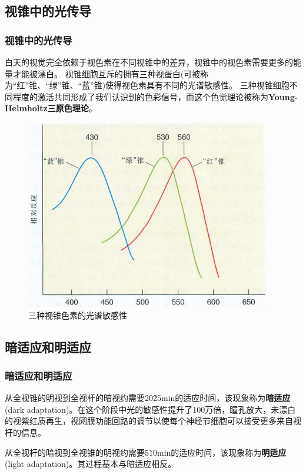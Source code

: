\subsection{视锥中的光传导}
\begin{frame}
    \frametitle{视锥中的光传导}

    白天的视觉完全依赖于视色素在不同视锥中的差异，视锥中的视色素需要更多的能量才能被漂白。
    视锥细胞互斥的拥有三种视蛋白(可被称为“红”锥、“绿”锥、“蓝”锥)使得视色素具有不同的光谱敏感性。
    三种视锥细胞不同程度的激活共同形成了我们认识到的色彩信号，而这个色觉理论被称为\textbf{Young-Helmholtz三原色理论}。
    \begin{figure}
        \centering
        \includegraphics[height=.4\textheight]{img/pic5-3.png}
        \caption{三种视锥色素的光谱敏感性\label{pic5-3}}
    \end{figure}
\end{frame}

\subsection{暗适应和明适应}
\begin{frame}
    \frametitle{暗适应和明适应}

    从全视锥的明视到全视杆的暗视约需要20\~25min的适应时间，该现象称为\textbf{暗适应}(dark adaptation)。在这个阶段中光的敏感性提升了100万倍，瞳孔放大，未漂白的视紫红质再生，视网膜功能回路的调节以使每个神经节细胞可以接受更多来自视杆的信息。

    从全视杆的暗视到全视锥的明视约需要5\~10min的适应时间，该现象称为\textbf{明适应}(light adaptation)。其过程基本与暗适应相反。

\end{frame}